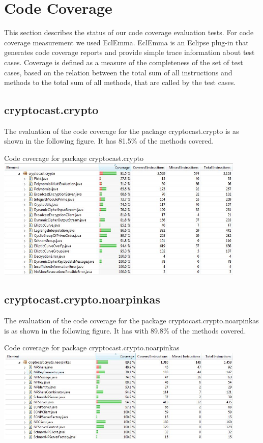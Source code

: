 \documentclass[a4paper,10pt]{scrartcl}
\begin{document}
\newpage
\section{Code Coverage}
This section describes the status of our code coverage evaluation tests. For code coverage measurement we used EclEmma.
EclEmma is an Eclipse plug-in that generates code coverage reports and provide simple trace information about test cases. Coverage is defined as a measure of the completeness of the set of test cases, based on the relation between the total sum of all instructions and methods to the total sum of all methods, that are called by the test cases.


\subsection{cryptocast.crypto}
The evaluation of the code coverage for the package cryptocast.crypto is as shown in the following figure.
It has 81.5\% of the methods covered.

\begin{illustration}{Code coverage for package cryptocast.crypto}
\includegraphics[width=450px]{figures/images/crypto.jpg}
\end{illustration}
\newpage

\subsection{cryptocast.crypto.noarpinkas}
The evaluation of the code coverage for the package cryptocast.crypto.noarpinkas is as shown in the following figure.
It has with 89.8\% of the methods covered.

\begin{illustration}{Code coverage for package cryptocast.crypto.noarpinkas}
\includegraphics[width=450px]{figures/images/noarpinkas.jpg}
\end{illustration}
\end{document}
